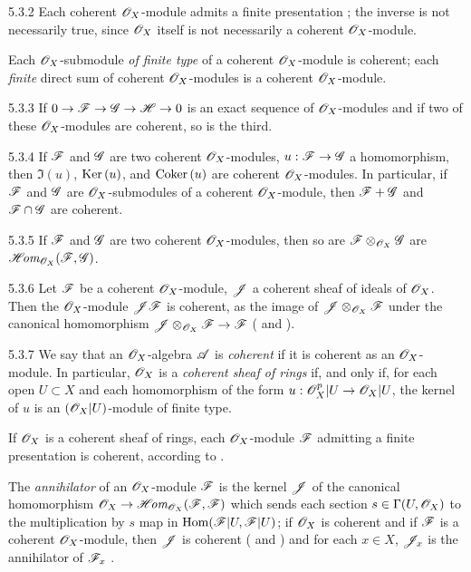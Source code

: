 \begin{env}{5.3.2}
\label{env-0.5.3.2}
Each coherent $\mathscr{O}_X$-module admits a finite presentation ; the inverse is
not necessarily true, since $\mathscr{O}_X$ itself is not necessarily a coherent $\mathscr{O}_X$-module.

Each $\mathscr{O}_X$-submodule \emph{of finite type} of a coherent $\mathscr{O}_X$-module is coherent; each
\emph{finite} direct sum of coherent $\mathscr{O}_X$-modules is a coherent $\mathscr{O}_X$-module.
\end{env}

\begin{env}{5.3.3}
\label{env-0.5.3.3}
If $0\to\mathscr{F}\to\mathscr{G}\to\mathscr{H}\to 0$ is an exact sequence  of $\mathscr{O}_X$-modules and if two of
these $\mathscr{O}_X$-modules are coherent, so is the third.
\end{env}

\begin{env}{5.3.4}
\label{env-0.5.3.4}
If $\mathscr{F}$ and $\mathscr{G}$ are two coherent $\mathscr{O}_X$-modules, $u:\mathscr{F}\to\mathscr{G}$ a
homomorphism, then $\Im(u)$, ${\mathop{\mathrm{Ker}}\nolimits}\,(u)$, and ${\mathop{\mathrm{Coker}}\nolimits}\,(u)$ are coherent $\mathscr{O}_X$-modules. In
particular, if $\mathscr{F}$ and $\mathscr{G}$ are $\mathscr{O}_X$-submodules of a coherent $\mathscr{O}_X$-module,
then $\mathscr{F}+\mathscr{G}$ and $\mathscr{F}\cap\mathscr{G}$ are coherent.
\end{env}

\begin{env}{5.3.5}
\label{env-0.5.3.5}
If $\mathscr{F}$ and $\mathscr{G}$ are two coherent $\mathscr{O}_X$-modules, then so are
$\mathscr{F}\otimes_{\mathscr{O}_X}\mathscr{G}$ are $\mathscr{H}\!\textit{om}_{\mathscr{O}_X}(\mathscr{F},\mathscr{G})$.
\end{env}

\begin{env}{5.3.6}
\label{env-0.5.3.6}
Let $\mathscr{F}$ be a coherent $\mathscr{O}_X$-module, $\mathscr{J}$ a coherent sheaf of ideals of $\mathscr{O}_X$.
Then the $\mathscr{O}_X$-module $\mathscr{J}\mathscr{F}$ is coherent, as the image of
$\mathscr{J}\otimes_{\mathscr{O}_X}\mathscr{F}$ under the canonical homomorphism
$\mathscr{J}\otimes_{\mathscr{O}_X}\mathscr{F}\to\mathscr{F}$ ( and ).
\end{env}

\begin{env}{5.3.7}
\label{env-0.5.3.7}
We say that an $\mathscr{O}_X$-algebra $\mathscr{A}$ is \emph{coherent} if it is coherent as an
$\mathscr{O}_X$-module. In particular, $\mathscr{O}_X$ is a \emph{coherent sheaf of rings} if, and only if,
for each open $U\subset X$ and each homomorphism of the form $u:\mathscr{O}_X^p|U\to\mathscr{O}_X|U$, the
kernel of $u$ is an $(\mathscr{O}_X|U)$-module of finite type.

If $\mathscr{O}_X$ is a coherent sheaf of rings, each $\mathscr{O}_X$-module $\mathscr{F}$ admitting a finite
presentation  is coherent, according to .

The \emph{annihilator} of an $\mathscr{O}_X$-module $\mathscr{F}$ is the kernel $\mathscr{J}$ of the canonical
homomorphism $\mathscr{O}_X\to\mathscr{H}\!\textit{om}_{\mathscr{O}_X}(\mathscr{F},\mathscr{F})$ which sends each section
$s\in\Gamma(U,\mathscr{O}_X)$ to the multiplication by $s$ map in ${\mathop{\mathrm{Hom}}\nolimits}(\mathscr{F}|U,\mathscr{F}|U)$; if
$\mathscr{O}_X$ is coherent and if $\mathscr{F}$ is a coherent $\mathscr{O}_X$-module, then $\mathscr{J}$ is coherent
( and ) and for each $x\in X$, $\mathscr{J}_x$ is the
annihilator of $\mathscr{F}_x$ .
\end{env}

